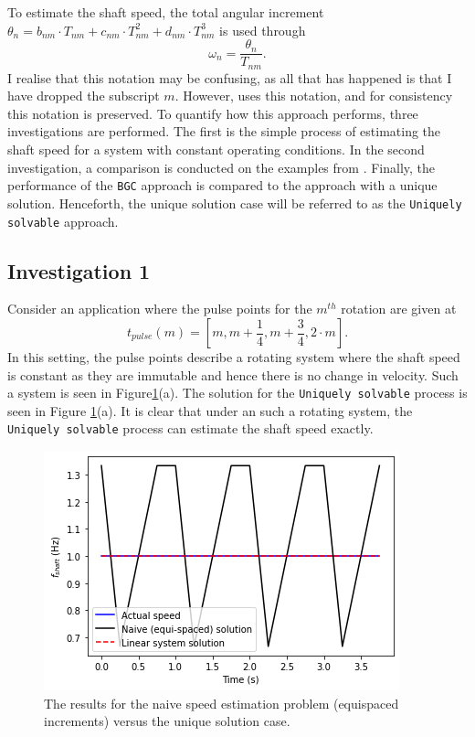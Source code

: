 \documentclass{article}
\begin{document}
	To estimate the shaft speed, the total angular increment $\theta_{n} = b_{nm} \cdot T_{nm} + c_{nm} \cdot T_{nm}^2 + d_{nm} \cdot T_{nm}^3$ is used through
	\begin{equation}\label{eq:speed}
		\omega_n = \frac{\theta_n}{T_{nm}}.
	\end{equation}
	I realise that this notation may be confusing, as all that has happened is that I have dropped the subscript $m$. However, \cite{Diamond2016} uses this notation, and for consistency this notation is preserved. To quantify how this approach performs, three investigations are performed. The first is the simple process of estimating the shaft speed for a system with constant operating conditions. In the second investigation, a comparison is conducted on the examples from \cite{Diamond2016}. Finally, the performance of the \texttt{\texttt{BGC}} approach is compared to the approach with a unique solution. Henceforth, the unique solution case will be referred to as the \texttt{Uniquely solvable} approach. 
	
	\subsection{Investigation 1}
	
	Consider an application where the pulse points for the $m^{th}$ rotation are given at
	\begin{equation}
		t_{pulse}(m) = [m, m + \frac{1}{4}, m + \frac{3}{4}, 2 \cdot m].
	\end{equation}
	In this setting, the pulse points describe a rotating system where the shaft speed is constant as they are immutable and hence there is no change in velocity. Such a system is seen in Figure\ref{fig:Q4_constant}(a). The solution for the \texttt{Uniquely solvable} process is seen in Figure \ref{fig:Q4_constant}(a). It is clear that under an such a rotating system, the \texttt{Uniquely solvable} process can estimate the shaft speed exactly.
	\begin{figure}[htb!]
		\centering
		\includegraphics[scale=0.4]{Q4_1.png}
		\caption{The results for the naive speed estimation problem (equispaced increments) versus the unique solution case.}
		\label{fig:Q4_constant}
	\end{figure}
\end{document}

